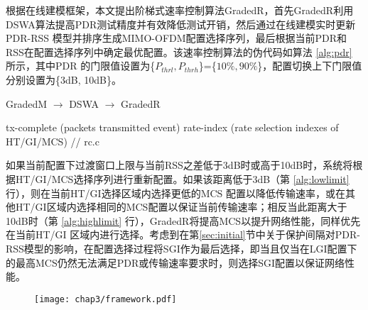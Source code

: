 根据在线建模框架，本文提出阶梯式速率控制算法GradedR，首先GradedR利用DSWA算法提高PDR测试精度并有效降低测试开销，然后通过在线建模实时更新PDR-RSS 模型并排序生成MIMO-OFDM配置选择序列，最后根据当前PDR和RSS在配置选择序列中确定最优配置。该速率控制算法的伪代码如算法 \ref{alg:pdr} 所示，其中PDR 的门限值设置为\{$P_{thrl},P_{thrh}$\}=\{$10\%,90\%$\}，配置切换上下门限值分别设置为\{3dB, 10dB\}。

\begin{algorithm}[!htp]
\renewcommand{\algorithmicrequire}{\textbf{输入：}}
\renewcommand{\algorithmicensure}{\textbf{输出：}}
\caption{GradedM $\rightarrow$ DSWA $\rightarrow$ GradedR}
\label{alg:pdr}
\begin{algorithmic}[1]
\Require tx-complete (packets transmitted event)
\Ensure  rate-index (rate selection indexes of HT/GI/MCS)
 \label{alg:lowlimit}
 // rc.c
\EndIf
{} \label{alg:highlimit}
\EndIf
\State {}
\end{algorithmic}
\end{algorithm}

如果当前配置下过渡窗口上限与当前RSS之差低于3dB时或高于10dB时，系统将根据HT/GI/MCS选择序列进行重新配置。如果该距离低于3dB（第 \ref{alg:lowlimit} 行），则在当前HT/GI选择区域内选择更低的MCS 配置以降低传输速率，或在其他HT/GI区域内选择相同的MCS配置以保证当前传输速率；相反当此距离大于10dB时（第 \ref{alg:highlimit} 行），GradedR将提高MCS以提升网络性能，同样优先在当前HT/GI 区域内进行选择。考虑到在第\ref{sec:initial}节中关于保护间隔对PDR-RSS模型的影响，在配置选择过程将SGI作为最后选择，即当且仅当在LGI配置下的最高MCS仍然无法满足PDR或传输速率要求时，则选择SGI配置以保证网络性能。

\begin{figure}[!htp]
\centering
\texttt{[image: chap3/framework.pdf]}
\end{figure}

